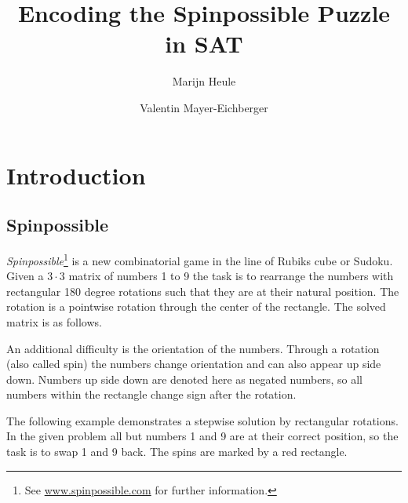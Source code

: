 \documentclass[]{llncs}
\author{Marijn Heule \and Valentin Mayer-Eichberger}
\institute{Department of Software Technology\\
Delft University of Technology\\
\email{marijn@heule.nl} \\
\email{mayereichberger@gmail.com}
}
\title{Encoding the Spinpossible Puzzle in SAT}
\newcommand{\spintable}[9]{ 
\node [matrix,ampersand replacement=\&,nodes={minimum size=6mm}]
    {
        \node (n11) {#1}; \& \node (n12) {#2}; \& \node {#3}; \\ 
        \node {#4}; \& \node{#5}; \& \node {#6}; \\ 
        \node {#7}; \& \node{#8}; \& \node (n33) {#9}; \\ 
    }; 
\draw[gray] (n11.north west) rectangle (n33.south east);
}
\begin{document}
 

\maketitle

\section{Introduction}

\subsection{Spinpossible}

\emph{Spinpossible}\footnote{See \url{www.spinpossible.com} for further information.} is a new combinatorial game in the
line of Rubiks cube or Sudoku. Given a $3\cdot 3$ matrix of numbers 1 to 9 the task is to rearrange the numbers with
rectangular 180 degree rotations such that they are at their natural position. The rotation is a pointwise rotation
through the center of the rectangle. The solved matrix is as follows.

\begin{center}
\end{center}

An additional difficulty is the orientation of the numbers. Through a rotation (also called spin) the numbers change
orientation and can also appear up side down. Numbers up side down are denoted here as negated numbers, so all numbers
within the rectangle change sign after the rotation.  

The following example demonstrates a stepwise solution by rectangular rotations. In the given problem all but numbers 1
and 9 are at their correct position, so the task is to swap 1 and 9 back. The spins are marked by a red
rectangle.

\vspace{0.5cm}

\end{document}
